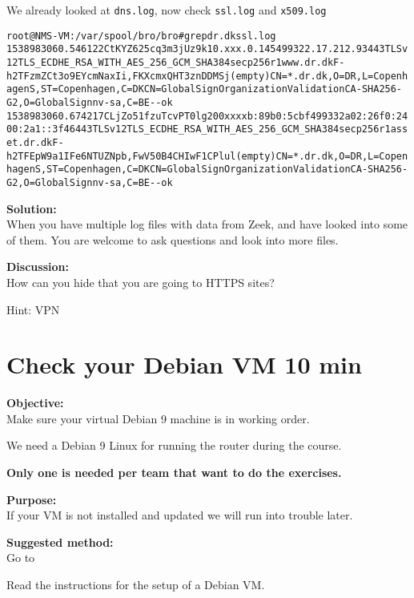 \documentclass[a4paper,11pt,notitlepage]{report}
\begin{document}
We already looked at \verb+dns.log+, now check \verb+ssl.log+ and \verb+x509.log+

\begin{alltt}\small
root@NMS-VM:/var/spool/bro/bro# grep dr.dk ssl.log
1538983060.546122	CtKYZ625cq3m3jUz9k	10.xxx.0.145	49932	2.17.212.93	443	TLSv12	TLS_ECDHE_RSA_WITH_AES_256_GCM_SHA384	secp256r1	www.dr.dk	F	-	h2	T	FzmZCt3o9EYcmNaxIi,FKXcmxQHT3znDDMSj	(empty)	CN=*.dr.dk,O=DR,L=Copenhagen S,ST=Copenhagen,C=DK	CN=GlobalSign Organization Validation CA - SHA256 - G2,O=GlobalSign nv-sa,C=BE	-	-	ok
1538983060.674217	CLjZo51fzuTcvPT0lg	200xxxxb:89b0:5cbf	49933	2a02:26f0:2400:2a1::3f46	443	TLSv12	TLS_ECDHE_RSA_WITH_AES_256_GCM_SHA384	secp256r1	asset.dr.dk	F	-	h2	TFEpW9a1IFe6NTUZNpb,FwV50B4CHIwF1CPlul	(empty)	CN=*.dr.dk,O=DR,L=Copenhagen S,ST=Copenhagen,C=DK	CN=GlobalSign Organization Validation CA - SHA256 - G2,O=GlobalSign nv-sa,C=BE	-	-	ok
\end{alltt}

{\bf Solution:}\\
When you have multiple log files with data from Zeek, and have looked into some of them. You are welcome to ask questions and look into more files.


{\bf Discussion:}\\
How can you hide that you are going to HTTPS sites?

Hint: VPN





\chapter{Check your Debian VM 10 min}
\label{ex:basicDebianVM}


{\bf Objective:}\\
Make sure your virtual Debian 9 machine is in working order.

We need a Debian 9 Linux for running the router during the course.

{\bf Only one is needed per team that want to do the exercises. }

{\bf Purpose:}\\
If your VM is not installed and updated we will run into trouble later.

{\bf Suggested method:}\\
Go to 

Read the instructions for the setup of a Debian VM.
\end{document}
